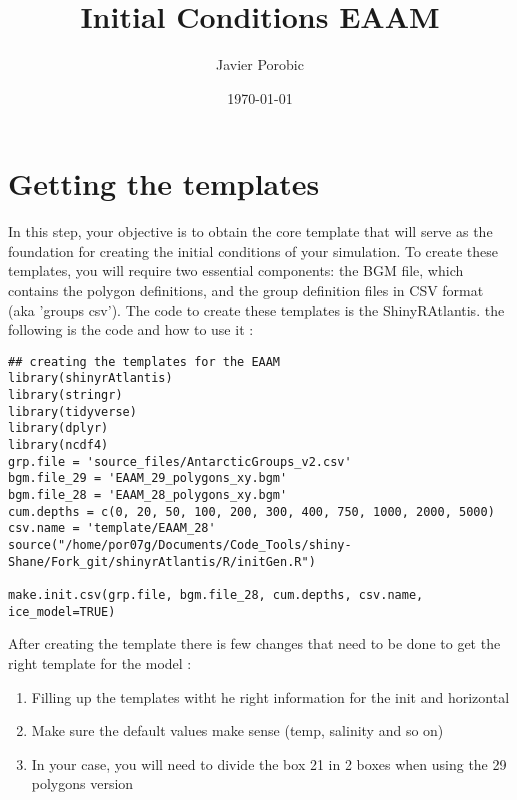 \documentclass[a4paper]{article}
\author{Javier Porobic}
\date{\today}
\title{Initial Conditions EAAM}
\begin{document}
\maketitle
\tableofcontents

\tableofcontents

\section{Getting the templates}
\label{sec:org7ec8331}
In this step, your objective is to obtain the core template that will serve as the
foundation for creating the initial conditions of your simulation. To create these
templates, you will require two essential components: the BGM file, which contains
the polygon definitions, and the group definition files in CSV format (aka 'groups
csv'). The code to create these templates is the ShinyRAtlantis. the following is the
code and how to use it :
\begin{verbatim}
## creating the templates for the EAAM
library(shinyrAtlantis)
library(stringr)
library(tidyverse)
library(dplyr)
library(ncdf4)
grp.file = 'source_files/AntarcticGroups_v2.csv'
bgm.file_29 = 'EAAM_29_polygons_xy.bgm'
bgm.file_28 = 'EAAM_28_polygons_xy.bgm'
cum.depths = c(0, 20, 50, 100, 200, 300, 400, 750, 1000, 2000, 5000)
csv.name = 'template/EAAM_28'
source("/home/por07g/Documents/Code_Tools/shiny-Shane/Fork_git/shinyrAtlantis/R/initGen.R")

make.init.csv(grp.file, bgm.file_28, cum.depths, csv.name, ice_model=TRUE)
\end{verbatim}

After creating the template there is few changes that need to be done to get the
right template for the model :
\begin{enumerate}
\item Filling up the templates witht he right information for the init and horizontal
\item Make sure the default values make sense (temp,  salinity and so on)
\item In your case, you will need to divide the box 21 in 2 boxes when using the 29 polygons version
\end{enumerate}
\end{document}
